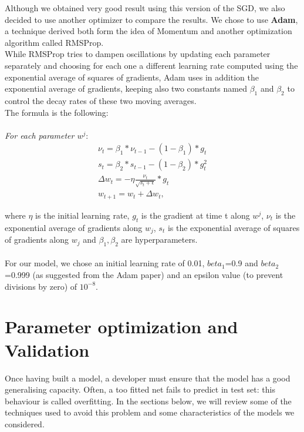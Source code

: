 \documentclass[12pt]{article}
\begin{document}
Although we obtained very good result using this version of the SGD, we also decided to use another optimizer to compare the results. We chose to use \textbf{Adam}, a technique derived both form the idea of Momentum and another optimization algorithm called RMSProp. \\
While RMSProp tries to dampen oscillations by updating each parameter separately and choosing for each one a different learning rate computed using the exponential average of squares of gradients, Adam uses in addition the exponential average of gradients, keeping also two constants named $\beta_{1}$ and $\beta_{2}$ to control the decay rates of these two moving averages. \\
The formula is the following: \\ \\


\textit{For each parameter $w^{j}$}: \\
\begin{align*}
\nu_{t}  = \beta_{1}  *  \nu_{t-1} - (1 - \beta_{1}) *g_{t} \\
s_{t} =  \beta_{2} * s_{t-1} - (1-\beta_{2}) * g_{t}^2\\
\Delta w_{t} = -\eta \frac{\nu_{t}}{\sqrt{s_{t} + \epsilon}}* g_{t}\\
w_{t+1} = w_{t} + \Delta w_{t},
\end{align*}

where $\eta$ is the initial learning rate, $g_{t}$ is the gradient at time t along $w^{j}$, $\nu_{t}$ is the exponential average of gradients along $w_{j}$, $s_{t}$ is the exponential average of squares of gradients along $w_{j}$ and $\beta_{1},\beta_{2}$ are hyperparameters. \\ \\
For our model, we chose an initial learning rate of 0.01, $beta_{1}$=0.9 and $beta_{2}$=0.999 (as suggested from the Adam paper) and an epsilon value (to prevent divisions by zero) of $10^{-8}$.


\section{Parameter optimization and Validation}
Once having built a model, a developer must ensure that the model has a good generalising capacity. Often, a too fitted net fails to predict in test set: this behaviour is called overfitting.
In the sections below, we will review some of the techniques used to avoid this problem and some characteristics of the models we considered.
\end{document}

